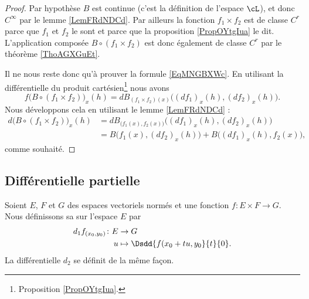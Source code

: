 \begin{proof}
    Par hypothèse \( B\) est continue (c'est la définition de l'espace \( \cL\)), et donc \(  C^{\infty}\) par le lemme \ref{LemFRdNDCd}. Par ailleurs la fonction \( f_1\times f_2\) est de classe \( C^r\) parce que \( f_1\) et \( f_2\) le sont et parce que la proposition \ref{PropOYtgIua} le dit. L'application composée \( B\circ(f_1\times f_2)\) est donc également de classe \( C^r\) par le théorème \ref{ThoAGXGuEt}.

    Il ne nous reste donc qu'à prouver la formule \ref{EqMNGBXWc}. En utilisant la différentielle du produit cartésien\footnote{Proposition \ref{PropOYtgIua}.} nous avons
    \begin{equation}
        f\big( B\circ(f_1\times f_2) \big)_x(h)=dB_{(f_1\times f_2)(x)}\big( (df_1)_x(h),(df_2)_x(h) \big).
    \end{equation}
    Nous développons cela en utilisant le lemme \ref{LemFRdNDCd} :
    \begin{subequations}
        \begin{align}
        d\big( B\circ(f_1\times f_2) \big)_x(h)&=dB_{\big( f_1(x),f_2(x) \big)}\big( (df_1)_x(h),(df_2)_x(h) \big)\\
        &=B\big( f_1(x),(df_2)_x(h) \big)+B\big( (df_1)_x(h),f_2(x) \big),
        \end{align}
    \end{subequations}
    comme souhaité.
\end{proof}

\subsection{Différentielle partielle}

\begin{definition}    \label{VJM_CtSKT}
    Soient \( E\), \( F\) et \( G\) des espaces vectoriels normés et une fonction \( f\colon E\times F\to G\). Nous définissons sa  sur l'espace \( E\) par
    \begin{equation}
        \begin{aligned}
            d_1f_{(x_0,y_0)}\colon E&\to G \\
            u&\mapsto \Dsdd{ f(x_0+tu,y_0 }{t}{0} .
        \end{aligned}
    \end{equation}
    La différentielle \( d_2\) se définit de la même façon.
\end{definition}

